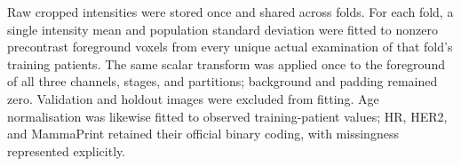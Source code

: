 Raw cropped intensities were stored once and shared across folds. For each
fold, a single intensity mean and population standard deviation were fitted
to nonzero precontrast foreground voxels from every unique actual examination
of that fold's training patients. The same scalar transform was applied once
to the foreground of all three channels, stages, and partitions; background
and padding remained zero. Validation and holdout images were excluded from
fitting. Age normalisation was likewise fitted to observed training-patient
values; HR, HER2, and MammaPrint retained their official binary coding, with
missingness represented explicitly.
